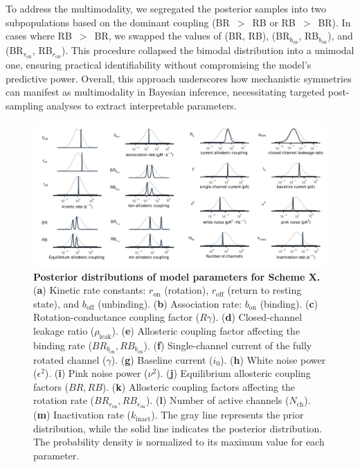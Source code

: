 \documentclass[pdflatex,sn-nature]{sn-jnl}%
\theoremstyle{thmstyleone}%
\theoremstyle{thmstyletwo}%
\theoremstyle{thmstylethree}%
\begin{document}
To address the multimodality, we segregated the posterior samples into two subpopulations based on the dominant coupling (BR~$>$~RB or RB~$>$~BR). In cases where RB~$>$~BR, we swapped the values of (BR, RB), (BR$_{b_{\text{on}}}$, RB$_{b_{\text{on}}}$), and (BR$_{r_{\text{on}}}$, RB$_{r_{\text{on}}}$). This procedure collapsed the bimodal distribution into a unimodal one, ensuring practical identifiability without compromising the model's predictive power. Overall, this approach underscores how mechanistic symmetries can manifest as multimodality in Bayesian inference, necessitating targeted post-sampling analyses to extract interpretable parameters.
\begin{figure}[t]
	\centering
	\includegraphics[width=\linewidth]{Figure_2.pdf}
	\caption{\textbf{Posterior distributions of model parameters for Scheme X.}  
		(\textbf{a}) Kinetic rate constants: \(r_{\text{on}}\) (rotation), \(r_{\text{off}}\) (return to resting state), and \(b_{\text{off}}\) (unbinding).  
		(\textbf{b}) Association rate: \(b_{\text{on}}\) (binding).  
		(\textbf{c}) Rotation-conductance coupling factor (\(R\gamma\)).  
		(\textbf{d}) Closed-channel leakage ratio (\(\rho_{\text{leak}}\)).  
		(\textbf{e}) Allosteric coupling factor affecting the binding rate (\(BR_{b_{\text{on}}}, RB_{b_{\text{on}}}\)).  
		(\textbf{f}) Single-channel current of the fully rotated channel (\(\gamma\)).  
		(\textbf{g}) Baseline current (\(i_0\)).  
		(\textbf{h}) White noise power (\(\epsilon^2\)).  
		(\textbf{i}) Pink noise power (\(\nu^2\)).  
		(\textbf{j}) Equilibrium allosteric coupling factors (\(BR, RB\)).  
		(\textbf{k}) Allosteric coupling factors affecting the rotation rate (\(BR_{r_{\text{on}}}, RB_{r_{\text{on}}}\)).  
		(\textbf{l}) Number of active channels (\(N_{\text{ch}}\)).  
		(\textbf{m}) Inactivation rate (\(k_{\text{inact}}\)).  
		The gray line represents the prior distribution, while the solid line indicates the posterior distribution. The probability density is normalized to its maximum value for each parameter.
	}
	\label{fig:posterior_SchemeX}
\end{figure}
\end{document}
